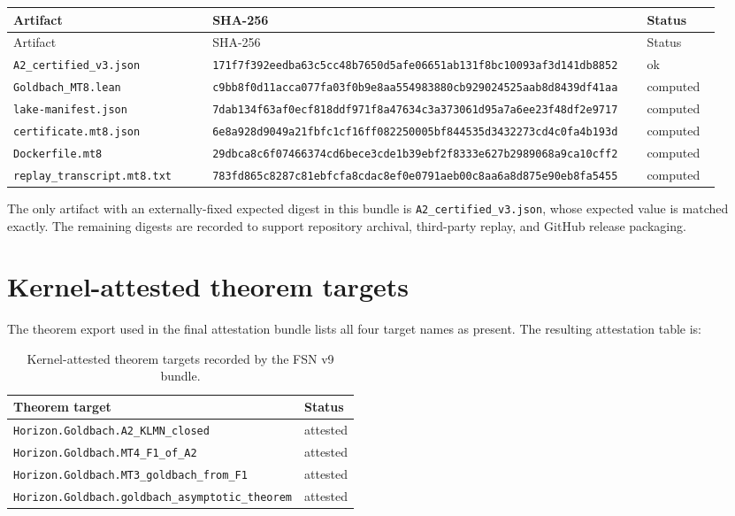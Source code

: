\documentclass[11pt]{article}
\begin{document}
\small
\begin{longtable}{@{}p{0.27\linewidth}p{0.56\linewidth}p{0.1\linewidth}@{}}
\toprule
Artifact & SHA-256 & Status \\
\midrule
\endfirsthead
\toprule
Artifact & SHA-256 & Status \\
\midrule
\endhead
\texttt{A2\_certified\_v3.json} & \texttt{171f7f392eedba63c5cc48b7650d5afe06651ab131f8bc10093af3d141db8852} & ok \\
\texttt{Goldbach\_MT8.lean} & \texttt{c9bb8f0d11acca077fa03f0b9e8aa554983880cb929024525aab8d8439df41aa} & computed \\
\texttt{lake-manifest.json} & \texttt{7dab134f63af0ecf818ddf971f8a47634c3a373061d95a7a6ee23f48df2e9717} & computed \\
\texttt{certificate.mt8.json} & \texttt{6e8a928d9049a21fbfc1cf16ff082250005bf844535d3432273cd4c0fa4b193d} & computed \\
\texttt{Dockerfile.mt8} & \texttt{29dbca8c6f07466374cd6bece3cde1b39ebf2f8333e627b2989068a9ca10cff2} & computed \\
\texttt{replay\_transcript.mt8.txt} & \texttt{783fd865c8287c81ebfcfa8cdac8ef0e0791aeb00c8aa6a8d875e90eb8fa5455} & computed \\
\bottomrule
\end{longtable}
\normalsize

The only artifact with an externally-fixed expected digest in this bundle is \texttt{A2\_certified\_v3.json}, whose expected value is matched exactly. The remaining digests are recorded to support repository archival, third-party replay, and GitHub release packaging.

\section{Kernel-attested theorem targets}
The theorem export used in the final attestation bundle lists all four target names as present. The resulting attestation table is:

\begin{table}[h!]
\centering
\begin{tabular}{@{}ll@{}}
\toprule
Theorem target & Status \\
\midrule
\texttt{Horizon.Goldbach.A2\_KLMN\_closed} & attested \\
\texttt{Horizon.Goldbach.MT4\_F1\_of\_A2} & attested \\
\texttt{Horizon.Goldbach.MT3\_goldbach\_from\_F1} & attested \\
\texttt{Horizon.Goldbach.goldbach\_asymptotic\_theorem} & attested \\
\bottomrule
\end{tabular}
\caption{Kernel-attested theorem targets recorded by the FSN v9 bundle.}
\end{table}
\end{document}
